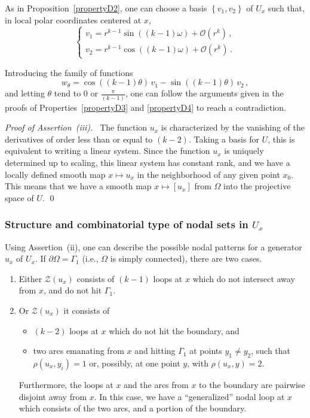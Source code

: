 \documentclass[12pt,a4paper]{amsart}
\theoremstyle{plain} %
\theoremstyle{definition}
\newtheorem{remark}[theorem]{Remark}
\numberwithin{equation}{section}
\numberwithin{figure}{section}
\numberwithin{table}{section}
\newcommand{\cZ}{\mathcal{Z}}
\newcommand{\set}[1]{\left\lbrace #1 \right\rbrace}
\begin{document}
 As in Proposition~\ref{propertyD2}, one can choose a basis $\set{v_1,v_2}$ of $U_x$ such that, in local polar coordinates centered at $x$,
%
\begin{equation*}
\left\{
\begin{array}{l}
v_1 = r^{k -1} \sin ((k -1)\omega) +\mathcal O (r^{k})\,,\\
v_2 = r^{k -1} \cos ((k -1)\omega) +\mathcal O (r^{k})\,.
\end{array}
\right.
\end{equation*}

Introducing the family of functions
%
\begin{equation*}
w_\theta = \cos((k -1) \theta) \,v_1 - \sin((k -1) \theta) \, v_2\,,
\end{equation*}
%
and letting $\theta$ tend to $0$ or $\frac{\pi}{(k - 1)}$, one can follow the arguments given in the proofs of  Properties~\ref{propertyD3} and \ref{propertyD4} to reach a contradiction.\medskip

\emph{Proof of Assertion~(iii).~} The function $u_x$ is characterized by the vanishing of the derivatives of order less than or equal to $(k -2)$. Taking a basis for $U$, this is equivalent to writing a linear system. Since the function $u_x$ is uniquely determined up to scaling, this linear system has constant rank, and we have a locally defined smooth map $x \mapsto u_x$ in the neighborhood of any given point $x_0$. This means that we have a smooth map $x \mapsto [u_x]$ from $\Omega$ into the projective space of $U$. \hfill \qed


\subsubsection{Structure and combinatorial type of nodal sets in $U_x$}\label{SSS-hmn-31ias}


Using Assertion~(ii), one can describe the possible nodal patterns for a generator $u_x$ of $U_x$.  If $\partial \Omega = \Gamma_1$ (i.e., $\Omega$ is simply connected), there are two cases.
\begin{enumerate}
   \item Either $\cZ(u_x)$ consists of $(k - 1)$ loops at $x$ which do not intersect away from $x$, and do not hit $\Gamma_1$.
   \item Or $\cZ(u_x)$ it consists of
   \begin{itemize}
     \item[$\diamond$] $(k - 2)$ loops at $x$ which do not hit the boundary, and
     \item[$\diamond$] two arcs emanating from $x$ and hitting $\Gamma_1$ at points $y_1 \neq y_2$, such that $\rho(u_x,y_i) = 1$ or, possibly, at one point $y$, with $\rho(u_x,y) = 2$.
   \end{itemize}
Furthermore, the loops at $x$ and the arcs from $x$ to the boundary are pairwise disjoint away from $x$.
In this case, we have a ``generalized'' nodal loop at $x$ which consists of the two arcs, and a portion of the boundary.
\end{enumerate}
\end{document}
